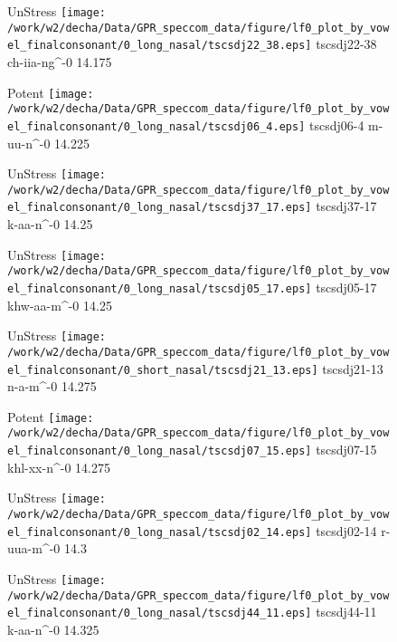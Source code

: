 \documentclass{article}
\begin{document}
\begin{figure}[t]
\begin{minipage}[b]{.24\textwidth}
UnStress
\centering
\texttt{[image: /work/w2/decha/Data/GPR\_speccom\_data/figure/lf0\_plot\_by\_vowel\_finalconsonant/0\_long\_nasal/tscsdj22\_38.eps]}
tscsdj22-38 ch-iia-ng\textasciicircum-0 14.175
\end{minipage}
\begin{minipage}[b]{.24\textwidth}
\colorbox{Apricot}{Potent}
\centering
\texttt{[image: /work/w2/decha/Data/GPR\_speccom\_data/figure/lf0\_plot\_by\_vowel\_finalconsonant/0\_long\_nasal/tscsdj06\_4.eps]}
tscsdj06-4 m-uu-n\textasciicircum-0 14.225
\end{minipage}
\begin{minipage}[b]{.24\textwidth}
UnStress
\centering
\texttt{[image: /work/w2/decha/Data/GPR\_speccom\_data/figure/lf0\_plot\_by\_vowel\_finalconsonant/0\_long\_nasal/tscsdj37\_17.eps]}
tscsdj37-17 k-aa-n\textasciicircum-0 14.25
\end{minipage}
\begin{minipage}[b]{.24\textwidth}
UnStress
\centering
\texttt{[image: /work/w2/decha/Data/GPR\_speccom\_data/figure/lf0\_plot\_by\_vowel\_finalconsonant/0\_long\_nasal/tscsdj05\_17.eps]}
tscsdj05-17 khw-aa-m\textasciicircum-0 14.25
\end{minipage}
\end{figure}

\begin{figure}[t]
\begin{minipage}[b]{.24\textwidth}
UnStress
\centering
\texttt{[image: /work/w2/decha/Data/GPR\_speccom\_data/figure/lf0\_plot\_by\_vowel\_finalconsonant/0\_short\_nasal/tscsdj21\_13.eps]}
tscsdj21-13 n-a-m\textasciicircum-0 14.275
\end{minipage}
\begin{minipage}[b]{.24\textwidth}
\colorbox{Apricot}{Potent}
\centering
\texttt{[image: /work/w2/decha/Data/GPR\_speccom\_data/figure/lf0\_plot\_by\_vowel\_finalconsonant/0\_long\_nasal/tscsdj07\_15.eps]}
tscsdj07-15 khl-xx-n\textasciicircum-0 14.275
\end{minipage}
\begin{minipage}[b]{.24\textwidth}
UnStress
\centering
\texttt{[image: /work/w2/decha/Data/GPR\_speccom\_data/figure/lf0\_plot\_by\_vowel\_finalconsonant/0\_long\_nasal/tscsdj02\_14.eps]}
tscsdj02-14 r-uua-m\textasciicircum-0 14.3
\end{minipage}
\begin{minipage}[b]{.24\textwidth}
UnStress
\centering
\texttt{[image: /work/w2/decha/Data/GPR\_speccom\_data/figure/lf0\_plot\_by\_vowel\_finalconsonant/0\_long\_nasal/tscsdj44\_11.eps]}
tscsdj44-11 k-aa-n\textasciicircum-0 14.325
\end{minipage}
\end{figure}
\end{document}
